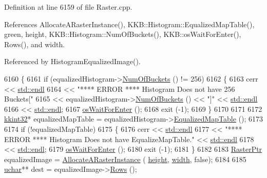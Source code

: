 Definition at line 6159 of file Raster.\+cpp.



References Allocate\+A\+Raster\+Instance(), K\+K\+B\+::\+Histogram\+::\+Equalized\+Map\+Table(), green, height, K\+K\+B\+::\+Histogram\+::\+Num\+Of\+Buckets(), K\+K\+B\+::os\+Wait\+For\+Enter(), Rows(), and width.



Referenced by Histogram\+Equalized\+Image().


\begin{DoxyCode}
6160 \{
6161   \textcolor{keywordflow}{if}  (equalizedHistogram->\hyperlink{class_k_k_b_1_1_histogram_a5ed817d12ec4f30eb761fcc4e57e42c7}{NumOfBuckets} () != 256)
6162   \{
6163     cerr << \hyperlink{namespace_k_k_b_ad1f50f65af6adc8fa9e6f62d007818a8}{std::endl}
6164          << \textcolor{stringliteral}{"**** ERROR ****    Histogram Does not have 256 Buckets["} 
6165          << equalizedHistogram->\hyperlink{class_k_k_b_1_1_histogram_a5ed817d12ec4f30eb761fcc4e57e42c7}{NumOfBuckets} () << \textcolor{stringliteral}{"]"}  << \hyperlink{namespace_k_k_b_ad1f50f65af6adc8fa9e6f62d007818a8}{std::endl}
6166          << \hyperlink{namespace_k_k_b_ad1f50f65af6adc8fa9e6f62d007818a8}{std::endl};
6167     \hyperlink{namespace_k_k_b_a255aa69aade7f429585349d08973e09f}{osWaitForEnter} ();
6168     exit (-1);
6169   \}
6170 
6171 
6172   \hyperlink{namespace_k_k_b_a8fa4952cc84fda1de4bec1fbdd8d5b1b}{kkint32}*  equalizedMapTable = equalizedHistogram->\hyperlink{class_k_k_b_1_1_histogram_a4aef03098feeca2316d2d8ea7862e1fe}{EqualizedMapTable} ();
6173 
6174   \textcolor{keywordflow}{if}  (!equalizedMapTable)
6175   \{
6176     cerr << \hyperlink{namespace_k_k_b_ad1f50f65af6adc8fa9e6f62d007818a8}{std::endl}
6177          << \textcolor{stringliteral}{"**** ERROR ****    Histogram Does not have EqualizeMapTable."}  << 
      \hyperlink{namespace_k_k_b_ad1f50f65af6adc8fa9e6f62d007818a8}{std::endl}
6178          << \hyperlink{namespace_k_k_b_ad1f50f65af6adc8fa9e6f62d007818a8}{std::endl};
6179     \hyperlink{namespace_k_k_b_a255aa69aade7f429585349d08973e09f}{osWaitForEnter} ();
6180     exit (-1);
6181   \}
6182 
6183   \hyperlink{class_k_k_b_1_1_raster}{RasterPtr}  equalizedImage = \hyperlink{class_k_k_b_1_1_raster_aa879980d112c01cb7ad9a3cfc7cd6f64}{AllocateARasterInstance} (
      \hyperlink{class_k_k_b_1_1_raster_af39ff189de4fbb6de98392e187efafb7}{height}, \hyperlink{class_k_k_b_1_1_raster_ae0bcc103e191c3421d7692dc69ceb554}{width}, \textcolor{keyword}{false});
6184 
6185   \hyperlink{namespace_k_k_b_ace9969169bf514f9ee6185186949cdf7}{uchar}**  dest = equalizedImage->\hyperlink{class_k_k_b_1_1_raster_a2460989f656e5222d6074cd0ba85ed72}{Rows} ();

\end{DoxyCode}
